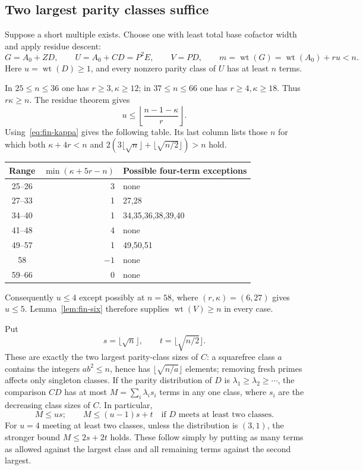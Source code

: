 \documentclass[11pt]{article}
\DeclareMathOperator{\wt}{wt}\DeclareMathOperator{\ord}{ord}
\numberwithin{equation}{section}
\theoremstyle{definition}\newtheorem{definition}[theorem]{Definition}
\theoremstyle{remark}\newtheorem{remark}[theorem]{Remark}
\begin{document}
\subsection{Two largest parity classes suffice}

Suppose a short multiple exists. Choose one with least total base
cofactor width and apply residue descent:
\[
 G=A_0+ZD,\qquad U=A_0+CD=P^2E,\qquad V=PD,
 \qquad m=\wt(G)=\wt(A_0)+ru<n.
\]
Here $u=\wt(D)\ge1$, and every nonzero parity class of $U$ has at
least $n$ terms.

In $25\le n\le36$ one has $r\ge3,\kappa\ge12$; in
$37\le n\le66$ one has $r\ge4,\kappa\ge18$.  Thus
$r\kappa\ge n$.  The residue theorem gives
\begin{equation}\label{eq:fin-binary-u}
 u\le\left\lfloor\frac{n-1-\kappa}{r}\right\rfloor.
\end{equation}
Using~\eqref{eq:fin-kappa} gives the following table. Its last column
lists those $n$ for which both
$\kappa+4r<n$ and $2(3\lfloor\sqrt n\rfloor+
\lfloor\sqrt{n/2}\rfloor)>n$ hold.
\begin{center}
\begin{tabular}{c|r|l}
Range&$\min(\kappa+5r-n)$&Possible four-term exceptions\\\hline
25--26&3&none\\
27--33&1&27,28\\
34--40&1&34,35,36,38,39,40\\
41--48&4&none\\
49--57&1&49,50,51\\
58&$-1$&none\\
59--66&0&none
\end{tabular}
\end{center}
Consequently $u\le4$ except possibly at $n=58$, where
$(r,\kappa)=(6,27)$ gives $u\le5$.  Lemma~\ref{lem:fin-six}
therefore supplies $\wt(V)\ge n$ in every case.

Put
\[
 s=\lfloor\sqrt n\rfloor,\qquad t=\lfloor\sqrt{n/2}\rfloor.
\]
These are exactly the two largest parity-class sizes of $C$: a
squarefree class $a$ contains the integers $ab^2\le n$, hence has
$\lfloor\sqrt{n/a}\rfloor$ elements; removing fresh primes affects
only singleton classes.  If the parity distribution of $D$ is
$\lambda_1\ge\lambda_2\ge\cdots$, the comparison $CD$ has at most
$M=\sum_i\lambda_i s_i$ terms in any one class, where $s_i$ are
the decreasing class sizes of $C$.  In particular,
\begin{equation}\label{eq:fin-majorization}
 M\le us;\qquad
 M\le(u-1)s+t\quad\text{if $D$ meets at least two classes}.
\end{equation}
For $u=4$ meeting at least two classes, unless the distribution is
$(3,1)$, the stronger bound
$M\le2s+2t$ holds.  These follow simply by putting as many terms
as allowed against the largest class and all remaining terms
against the second largest.
\end{document}
